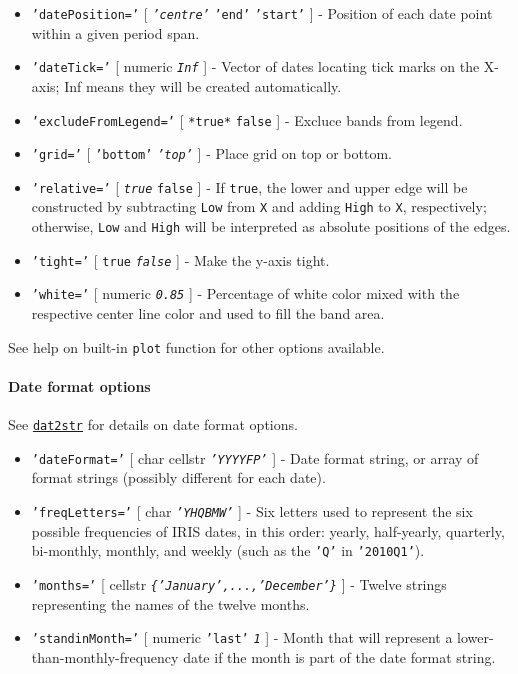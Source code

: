 \begin{itemize}
\item
  \texttt{'datePosition='} {[} \emph{\texttt{'centre'}} \textbar{}
  \texttt{'end'} \textbar{} \texttt{'start'} {]} - Position of each date
  point within a given period span.
\item
  \texttt{'dateTick='} {[} numeric \textbar{} \emph{\texttt{Inf}} {]} -
  Vector of dates locating tick marks on the X-axis; Inf means they will
  be created automatically.
\item
  \texttt{'excludeFromLegend='} {[} \texttt{*true*} \textbar{}
  \texttt{false} {]} - Excluce bands from legend.
\item
  \texttt{'grid='} {[} \texttt{'bottom'} \textbar{}
  \emph{\texttt{'top'}} {]} - Place grid on top or bottom.
\item
  \texttt{'relative='} {[} \emph{\texttt{true}} \textbar{}
  \texttt{false} {]} - If \texttt{true}, the lower and upper edge will
  be constructed by subtracting \texttt{Low} from \texttt{X} and adding
  \texttt{High} to \texttt{X}, respectively; otherwise, \texttt{Low} and
  \texttt{High} will be interpreted as absolute positions of the edges.
\item
  \texttt{'tight='} {[} \texttt{true} \textbar{} \emph{\texttt{false}}
  {]} - Make the y-axis tight.
\item
  \texttt{'white='} {[} numeric \textbar{} \emph{\texttt{0.85}} {]} -
  Percentage of white color mixed with the respective center line color
  and used to fill the band area.
\end{itemize}

See help on built-in \texttt{plot} function for other options available.

\paragraph{Date format options}

See \href{dates/dat2str}{\texttt{dat2str}} for details on date format
options.

\begin{itemize}
\item
  \texttt{'dateFormat='} {[} char \textbar{} cellstr \textbar{}
  \emph{\texttt{'YYYYFP'}} {]} - Date format string, or array of format
  strings (possibly different for each date).
\item
  \texttt{'freqLetters='} {[} char \textbar{} \emph{\texttt{'YHQBMW'}}
  {]} - Six letters used to represent the six possible frequencies of
  IRIS dates, in this order: yearly, half-yearly, quarterly, bi-monthly,
  monthly, and weekly (such as the \texttt{'Q'} in \texttt{'2010Q1'}).
\item
  \texttt{'months='} {[} cellstr \textbar{}
  \emph{\texttt{\{'January',...,'December'\}}} {]} - Twelve strings
  representing the names of the twelve months.
\item
  \texttt{'standinMonth='} {[} numeric \textbar{} \texttt{'last'}
  \textbar{} \emph{\texttt{1}} {]} - Month that will represent a
  lower-than-monthly-frequency date if the month is part of the date
  format string.
\end{itemize}

